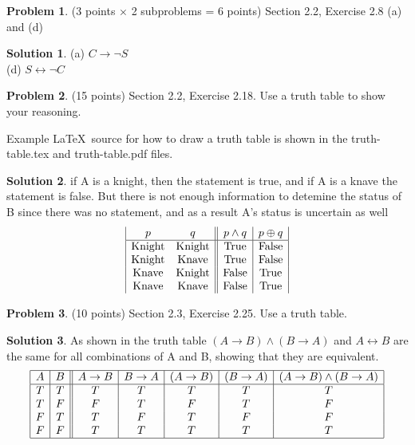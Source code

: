\documentclass{article}
\theoremstyle{definition}
\newtheorem{problem}{Problem}
\newtheorem*{solution}{Solution}
\begin{document}
\newpage
\begin{problem} (3 points $\times$ 2 subproblems = 6 points) Section 2.2, Exercise 2.8 (a) and (d)
\end{problem}
\begin{solution}
  (a) {$C \rightarrow \neg S$}
  \\(d) {$S \leftrightarrow \neg C$}
\end{solution}

\newpage
\begin{problem} (15 points) Section 2.2, Exercise 2.18.
Use a truth table to show your reasoning. 

Example \LaTeX\ source for how to draw a truth table is shown 
in the truth-table.tex and truth-table.pdf files.
\end{problem}
\begin{solution}
  if A is a knight, then the statement is true, and if A is a knave the statement is false.
  But there is not enough information to detemine the status of B since there was no statement, 
  and as a result A's status is uncertain as well
  \begin{displaymath}
    \begin{array}{|c c||c|c|}
    p & q & p \land q & p \oplus q\\
    \hline
    \text{Knight} & \text{Knight} & \text{True} & \text{False}\\
    \text{Knight} & \text{Knave} & \text{True} & \text{False}\\
    \text{Knave} & \text{Knight} & \text{False} & \text{True}\\
    \text{Knave} & \text{Knave} & \text{False} & \text{True}\\
    \end{array}
    \end{displaymath}
\end{solution}

\newpage
\begin{problem} (10 points) Section 2.3, Exercise 2.25.
Use a truth table.
\end{problem}
\begin{solution} 
  As shown in the truth table $(A \rightarrow B) \land (B \rightarrow A)$ and $A \leftrightarrow B$ are the same for all combinations of A and B, showing that they are equivalent.
    \begin{displaymath}
      \begin{array}{|c|c||c|c|c|c|c|}
      \hline
      A & B & A \rightarrow B & B \rightarrow A & (A \rightarrow B) & (B \rightarrow A) & (A \rightarrow B) \land (B \rightarrow A) \\
      \hline
      T & T & T & T & T & T & T \\
      T & F & F & T & F & T & F \\
      F & T & T & F & T & F & F \\
      F & F & T & T & T & T & T \\
      \hline
      \end{array}
    \end{displaymath}  
\end{solution}
\end{document}
